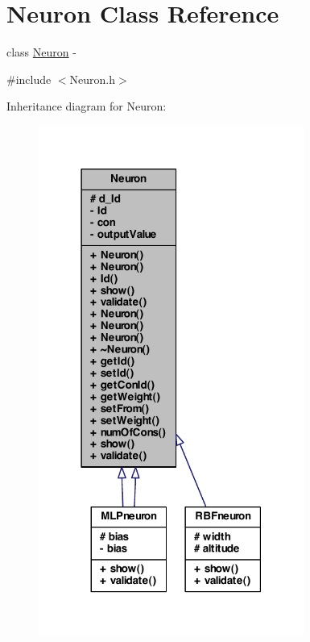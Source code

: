 \hypertarget{class_neuron}{
\section{Neuron Class Reference}
\label{class_neuron}
}


class \hyperlink{class_neuron}{Neuron} -\/  




{\ttfamily \#include $<$Neuron.h$>$}



Inheritance diagram for Neuron:
\nopagebreak
\begin{figure}[H]
\begin{center}
\leavevmode
\includegraphics[width=247pt]{class_neuron__inherit__graph}
\end{center}
\end{figure}


